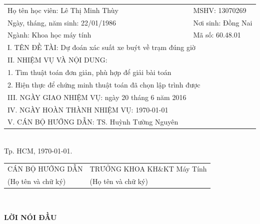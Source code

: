 \documentclass[a4paper, 13pt]{report}
\begin{document}
\begin{tabular}{ ll}
\vspace*{0.1cm}Họ tên học viên: Lê Thị Minh Thùy&\vspace*{0.1cm} MSHV: 13070269\\
\vspace*{0.1cm} Ngày, tháng, năm sinh: 22/01/1986 &\vspace*{0.1cm} Nơi sinh: Đồng Nai\\
\vspace*{0.1cm} Ngành: Khoa học máy tính & \vspace*{0.1cm} Mã số: 60.48.01\\
\multicolumn{2}{l}{\vspace*{1cm}I. TÊN ĐỀ TÀI: Dự đoán xác suất xe buýt về trạm đúng giờ} \\
\vspace*{0.1cm} II.  NHIỆM VỤ VÀ NỘI DUNG: \\
\multicolumn{2}{l}{\vspace*{0.1cm}1. Tìm thuật toán đơn giản, phù hợp để giải bài toán} \\
\multicolumn{2}{l}{\vspace*{3cm}2. Hiện thực để chứng minh thuật toán đã chọn lập trình được} \\

\vspace*{0.1cm} III.  NGÀY GIAO NHIỆM VỤ: ngày 20 tháng 6 năm 2016& \\
\vspace*{0.1cm} IV.  NGÀY HOÀN THÀNH NHIỆM VỤ: \today & \\
\vspace*{0.1cm}V. CÁN BỘ HƯỚNG DẪN: TS. Huỳnh Tường Nguyên & \\
\end{tabular}\\
\vspace*{1cm}
\hfill Tp. HCM, \today. 
\begin{tabular}{ p{7cm}p{9cm}}
 \hspace{1cm} CÁN BỘ HƯỚNG DẪN & TRƯỞNG KHOA KH$\&$KT Máy Tính\\
 \hspace{1cm}  (Họ tên và chữ ký) & (Họ tên và chữ ký)\\
\end{tabular}\\
\pagebreak
\begin{center}{\fontsize{16pt}{1}\selectfont \textbf{LỜI NÓI ĐẦU}}\\\end{center}
\end{document}
